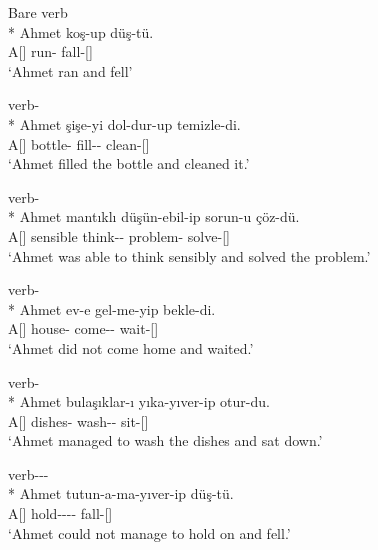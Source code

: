 \begin{exe}
    \ex \label{ipintro}
    \begin{xlist}
    \ex Bare verb\\*
    \gll Ahmet koş-up düş-tü. \\ 
    A[{\Nom}] run-{\Pc} fall-{\Pst}[{\Tsg}] \\
    \glt `Ahmet ran and fell'
    
    \ex verb-{\Caus}\\*
    \gll Ahmet şişe-yi dol-dur-up temizle-di. \\
    A[{\Nom}] bottle-{\Acc} fill-{\Caus}-{\Pc} clean-{\Pst}[{\Tsg}]\\
    \glt `Ahmet filled the bottle and cleaned it.'
    
    \ex verb-{\Abil}\\*
    \gll Ahmet mantıklı düşün-ebil-ip sorun-u çöz-dü. \\ 
    A[{\Nom}] sensible think-{\Abil}-{\Pc} problem-{\Acc} solve-{\Pst}[{\Tsg}] \\
    \glt `Ahmet was able to think sensibly and solved the problem.'
    
    \ex verb-{\Neg}\\*
    \gll Ahmet ev-e gel-me-yip bekle-di. \\
    A[{\Nom}] house-{\Dat} come-{\Neg}-{\Pc} wait-{\Pst}[{\Tsg}] \\
    \glt`Ahmet did not come home and waited.'
    
    \ex verb-{\Con}\\*
    \gll Ahmet bulaşıklar-ı yıka-yıver-ip otur-du. \\
    A[{\Nom}] dishes-{\Acc} wash-{\Con}-{\Pc} sit-{\Pst}[{\Tsg}]\\
    \glt `Ahmet managed to wash the dishes and sat down.'
    
    
    \ex verb-{\Abil}-{\Neg}-{\Con}\\*
    \gll Ahmet tutun-a-ma-yıver-ip düş-tü. \\ 
    A[{\Nom}] hold-{\Abil}-{\Neg}-{\Con}-{\Pc} fall-{\Pst}[{\Tsg}]\\
    \glt`Ahmet could not manage to hold on and fell.'
    \end{xlist}
\end{exe}


